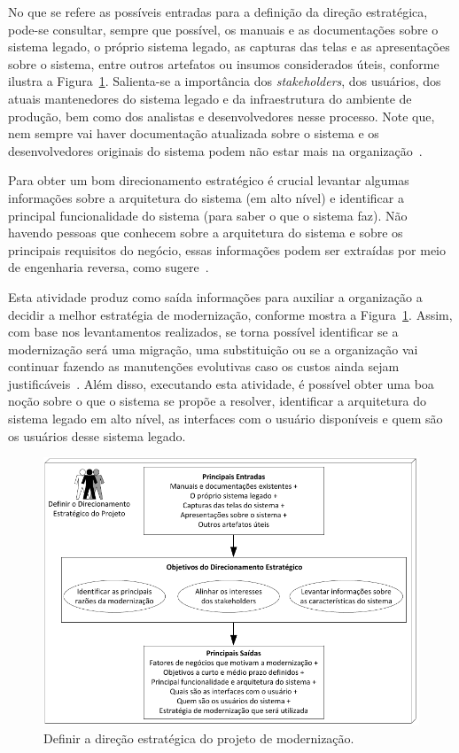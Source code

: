 No que se refere as possíveis entradas 
para a definição 
da direção estratégica, 
pode-se consultar, sempre que possível,
os manuais e as documentações sobre o sistema legado,
o próprio sistema legado, as capturas das telas e
as apresentações sobre o sistema,
entre 
outros artefatos ou insumos considerados úteis,
conforme ilustra a Figura~\ref{fig:direcao_estrategica}.
Salienta-se a importância dos \textit{stakeholders}, 
dos usuários, dos atuais mantenedores 
do sistema legado e da infraestrutura do 
ambiente de produção, 
bem como dos analistas e desenvolvedores nesse processo.
Note que, nem sempre vai haver
documentação atualizada sobre o sistema e 
os desenvolvedores
originais do sistema podem não estar mais na organização~\cite{S4_bennett1995legacy}.

Para obter um bom direcionamento estratégico
é crucial levantar algumas informações 
sobre a arquitetura do sistema (em alto nível) 
e identificar a principal funcionalidade do
sistema (para saber o que o sistema faz). 
Não havendo
pessoas que conhecem sobre a arquitetura do sistema 
e sobre os principais requisitos do negócio, 
essas informações podem
ser extraídas por meio de engenharia reversa, 
como sugere~\cite{OORP2013}. 


Esta atividade produz como saída
informações para auxiliar a organização a 
decidir a melhor estratégia de modernização, 
conforme mostra a Figura~\ref{fig:direcao_estrategica}. 
Assim,
com base nos levantamentos realizados, 
se torna possível identificar se a modernização será
uma migração, uma substituição ou se a organização 
vai continuar fazendo as manutenções evolutivas 
caso os custos ainda sejam justificáveis~\cite{S15_Comella-DordaASurvey2000}.
Além disso, executando esta atividade, 
é possível obter uma boa noção sobre o que
o sistema se propõe a resolver, identificar
a arquitetura do sistema legado em alto nível, 
as interfaces com o usuário disponíveis e quem são os
usuários desse sistema legado.

\begin{figure}[htb]
\centering
\includegraphics[scale=1]{img/processo/direcao_estrategica.pdf}
\caption{Definir a direção estratégica do projeto de modernização.}
\label{fig:direcao_estrategica}
\end{figure}


